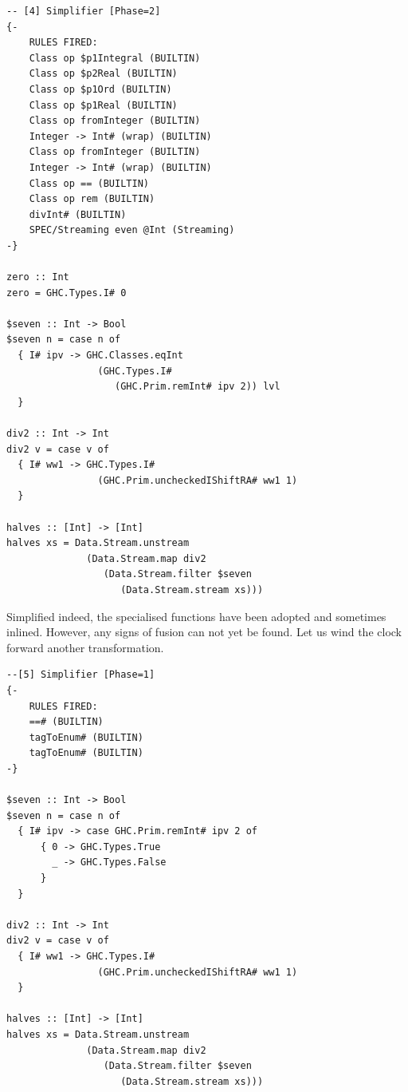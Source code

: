 \begin{listing}[H]
\begin{verbatim}
-- [4] Simplifier [Phase=2]
{-
    RULES FIRED:
    Class op $p1Integral (BUILTIN)
    Class op $p2Real (BUILTIN)
    Class op $p1Ord (BUILTIN)
    Class op $p1Real (BUILTIN)
    Class op fromInteger (BUILTIN)
    Integer -> Int# (wrap) (BUILTIN)
    Class op fromInteger (BUILTIN)
    Integer -> Int# (wrap) (BUILTIN)
    Class op == (BUILTIN)
    Class op rem (BUILTIN)
    divInt# (BUILTIN)
    SPEC/Streaming even @Int (Streaming)
-}

zero :: Int
zero = GHC.Types.I# 0

$seven :: Int -> Bool
$seven n = case n of
  { I# ipv -> GHC.Classes.eqInt
                (GHC.Types.I#
                   (GHC.Prim.remInt# ipv 2)) lvl
  }

div2 :: Int -> Int
div2 v = case v of
  { I# ww1 -> GHC.Types.I#
                (GHC.Prim.uncheckedIShiftRA# ww1 1)
  }

halves :: [Int] -> [Int]
halves xs = Data.Stream.unstream
              (Data.Stream.map div2
                 (Data.Stream.filter $seven
                    (Data.Stream.stream xs)))
\end{verbatim}
\end{listing}

Simplified indeed, the specialised functions have been adopted and sometimes inlined.
However, any signs of fusion can not yet be found. Let us wind the clock forward another
transformation.

\begin{listing}[H]
\begin{verbatim}
--[5] Simplifier [Phase=1]
{-
    RULES FIRED:
    ==# (BUILTIN)
    tagToEnum# (BUILTIN)
    tagToEnum# (BUILTIN)
-}

$seven :: Int -> Bool
$seven n = case n of
  { I# ipv -> case GHC.Prim.remInt# ipv 2 of
      { 0 -> GHC.Types.True
        _ -> GHC.Types.False
      }
  }

div2 :: Int -> Int
div2 v = case v of
  { I# ww1 -> GHC.Types.I#
                (GHC.Prim.uncheckedIShiftRA# ww1 1)
  }

halves :: [Int] -> [Int]
halves xs = Data.Stream.unstream
              (Data.Stream.map div2
                 (Data.Stream.filter $seven
                    (Data.Stream.stream xs)))
\end{verbatim}
\end{listing}

